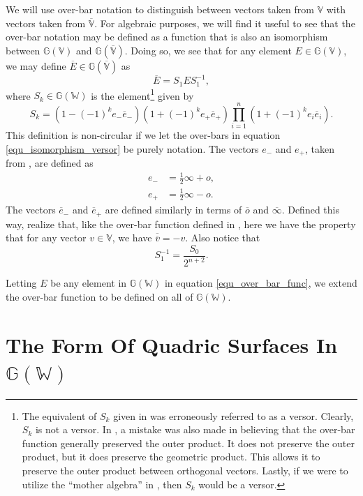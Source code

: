 \documentclass{birkjour}
\theoremstyle{definition}
\theoremstyle{remark}
\numberwithin{equation}{section}
\newcommand{\G}{\mathbb{G}}
\newcommand{\V}{\mathbb{V}}
\newcommand{\Vb}{\mathbb{\overline{V}}}
\newcommand{\W}{\mathbb{W}}
\newcommand{\nvao}{o}
\newcommand{\nvai}{\infty}
\newcommand{\nvaob}{\overline{o}}
\newcommand{\nvaib}{\overline{\infty}}
\newcommand{\eminus}{e_{-}}
\newcommand{\eplus}{e_{+}}
\newcommand{\eminusb}{\overline{e}_{-}}
\newcommand{\eplusb}{\overline{e}_{+}}
\begin{document}
We will use over-bar notation to distinguish between vectors taken from $\V$
with vectors taken from $\Vb$.  For algebraic purposes, we will find it useful
to see that the over-bar notation may be defined as a function
that is also an isomorphism between $\G(\V)$ and $\G(\Vb)$.
Doing so, we see that for any element $E\in\G(\V)$,
we may define $\overline{E}\in\G(\Vb)$ as
\begin{equation}\label{equ_over_bar_func}
\overline{E} = S_1ES_1^{-1},
\end{equation}
where $S_k\in\G(\W)$ is the element\footnote{The equivalent of $S_k$ given in \cite{Parkin12}
was erroneously referred to as a versor.  Clearly, $S_k$ is not a versor.  In \cite{Parkin12},
a mistake was also made in believing that the over-bar function generally preserved the outer product.
It does not preserve the outer product, but it does preserve the geometric product.
This allows it to preserve the outer product between orthogonal vectors.  Lastly, if we
were to utilize the ``mother algebra'' in \cite{DoranHestenes93}, then $S_k$ would be a versor.} given by
\begin{equation}\label{equ_isomorphism_versor}
S_k = (1-(-1)^k\eminus\eminusb)(1+(-1)^k\eplus\eplusb)\prod_{i=1}^n(1+(-1)^ke_i\overline{e}_i).
\end{equation}
This definition is non-circular if we let the over-bars in equation \eqref{equ_isomorphism_versor}
be purely notation.  The vectors $\eminus$ and $\eplus$, taken from \cite{LiRockwood},
are defined as
\begin{align}
\eminus &= \frac{1}{2}\nvai + \nvao, \\
\eplus &= \frac{1}{2}\nvai - \nvao.
\end{align}
The vectors $\eminusb$ and $\eplusb$ are defined similarly in terms of $\nvaob$ and $\nvaib$.
Defined this way, realize that, like the over-bar function defined in \cite{Parkin12},
here we have the property that for any vector $v\in\V$, we have $\overline{\overline{v}}=-v$.
Also notice that
\begin{equation}
S_1^{-1} = \frac{S_0}{2^{n+2}}.
\end{equation}

Letting $E$ be any element in $\G(\W)$ in equation \eqref{equ_over_bar_func},
we extend the over-bar function to be defined on all of $\G(\W)$.

\section{The Form Of Quadric Surfaces In $\G(\W)$}
\end{document}
